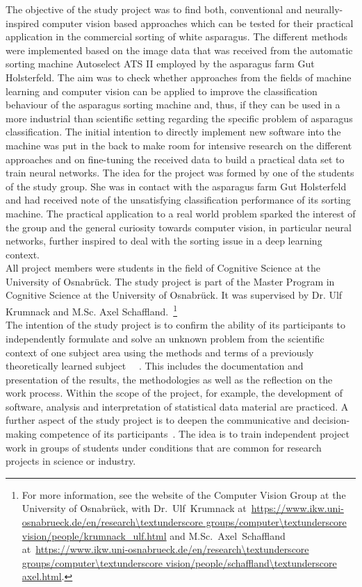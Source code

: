 The objective of the study project was to find both, conventional and neurally-inspired computer vision based approaches which can be tested for their practical application in the commercial sorting of white asparagus. The different methods were implemented based on the image data that was received from the automatic sorting machine Autoselect ATS II employed by the asparagus farm Gut Holsterfeld. The aim was to check whether approaches from the fields of machine learning and computer vision can be applied to improve the classification behaviour of the asparagus sorting machine and, thus, if they can be used in a more industrial than scientific setting regarding the specific problem of asparagus classification. The initial intention to directly implement new software into the machine was put in the back to make room for intensive research on the different approaches and on fine-tuning the received data to build a practical data set to train neural networks.
The idea for the project was formed by one of the students of the study group. She was in contact with the asparagus farm Gut Holsterfeld and had received note of the unsatisfying classification performance of its sorting machine. The practical application to a real world problem sparked the interest of the group and the general curiosity towards computer vision, in particular neural networks, further inspired to deal with the sorting issue in a deep learning context. \\
All project members were students in the field of Cognitive Science at the University of Osnabrück. The study project is part of the Master Program in Cognitive Science at the University of Osnabrück. It was supervised by Dr. Ulf Krumnack and M.Sc. Axel Schaffland.~\footnote{For more information, see the website of the Computer Vision Group at the University of Osnabrück, with Dr.~Ulf~Krumnack at~\url{https://www.ikw.uni-osnabrueck.de/en/research\textunderscore groups/computer\textunderscore vision/people/krumnack_ulf.html} and M.Sc.~Axel~Schaffland at~\url{https://www.ikw.uni-osnabrueck.de/en/research\textunderscore groups/computer\textunderscore vision/people/schaffland\textunderscore axel.html}.} \\
The intention of the study project is to confirm the ability of its participants to independently formulate and solve an unknown problem from the scientific context of one subject area using the methods and terms of a previously theoretically learned subject~\citep{moduledescription} ~\citep{studyregulations}. This includes the documentation and presentation of the results, the methodologies as well as the reflection on the work process. Within the scope of the project, for example, the development of software, analysis and interpretation of statistical data material are practiced. A further aspect of the study project is to deepen the communicative and decision-making competence of its participants~\citep{moduledescription}. The idea is to train independent project work in groups of students under conditions that are common for research projects in science or industry. \\
